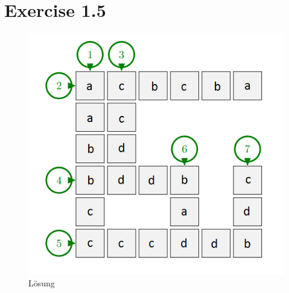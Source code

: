\documentclass{article}
\begin{document}
\section*{Exercise 1.5}
\begin{figure}[ht]
 \centering
 \includegraphics[scale=0.5]{KreuzwortRaetsel.png}
 \caption{L\"osung}
 \label{figure1}
\end{figure}
\end{document}
